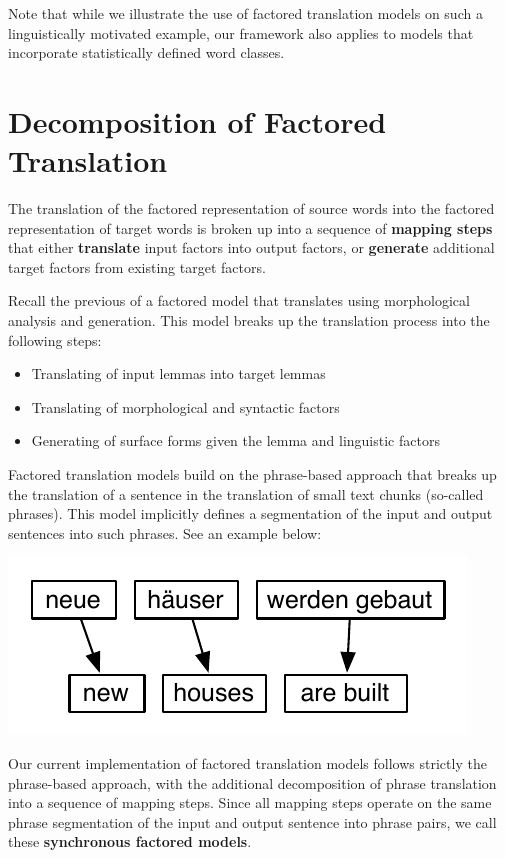 \documentclass[10pt]{report}
\theoremstyle{plain}
\begin{document}
Note that while we illustrate the use of factored translation models on such a linguistically motivated example, our framework also applies to models that incorporate statistically defined word classes.

\section{Decomposition of Factored Translation}\label{sec:factored-decomposition}
The translation of the factored representation of source words into the factored representation of target words is broken up into a sequence of {\bf mapping steps} that either {\bf translate} input factors into output factors, or {\bf generate} additional target factors from existing target factors.

Recall the previous  of a factored model that translates using morphological analysis and generation. This model breaks up the translation process into the following steps:
\begin{itemize}
\item Translating of input lemmas into target lemmas
\item Translating of morphological and syntactic factors
\item Generating of surface forms given the lemma and linguistic factors
\end{itemize}

Factored translation models build on the phrase-based approach that breaks up the translation of a sentence in the translation of small text chunks (so-called phrases). This model implicitly defines a segmentation of the input and output sentences into such phrases. See an example below:

\begin{center}
\includegraphics[scale=1]{phrase-model-houses.pdf}
\end{center}

Our current implementation of factored translation models follows strictly the phrase-based approach, with the additional decomposition of phrase translation into a sequence of mapping steps. Since all mapping steps operate on the same phrase segmentation of the input and output sentence into phrase pairs, we call these {\bf synchronous factored models}. 
\end{document}
